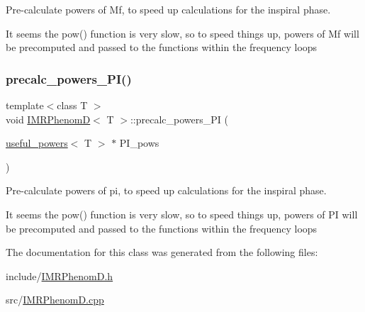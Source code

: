 Pre-\/calculate powers of Mf, to speed up calculations for the inspiral phase. 

It seems the pow() function is very slow, so to speed things up, powers of Mf will be precomputed and passed to the functions within the frequency loops \mbox{\label{classIMRPhenomD_a1181334310432c4d69ede3a3b2b0fcdb}} 
\subsubsection{\texorpdfstring{precalc\+\_\+powers\+\_\+\+P\+I()}{precalc\_powers\_PI()}}
{\footnotesize\ttfamily template$<$class T $>$ \\
void \hyperlink{classIMRPhenomD}{I\+M\+R\+PhenomD}$<$ T $>$\+::precalc\+\_\+powers\+\_\+\+PI (\begin{DoxyParamCaption}\item[{\hyperlink{structuseful__powers}{useful\+\_\+powers}$<$ T $>$ $\ast$}]{P\+I\+\_\+pows }\end{DoxyParamCaption})\hspace{0.3cm}{\ttfamily [virtual]}}



Pre-\/calculate powers of pi, to speed up calculations for the inspiral phase. 

It seems the pow() function is very slow, so to speed things up, powers of PI will be precomputed and passed to the functions within the frequency loops 

The documentation for this class was generated from the following files\+:\begin{DoxyCompactItemize}
\item 
include/\hyperlink{IMRPhenomD_8h}{I\+M\+R\+Phenom\+D.\+h}\item 
src/\hyperlink{IMRPhenomD_8cpp}{I\+M\+R\+Phenom\+D.\+cpp}\end{DoxyCompactItemize}
